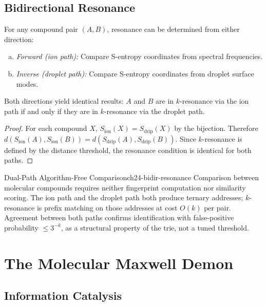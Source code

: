 \subsection{Bidirectional Resonance}
\label{sec:ch24-bidirectional}

\begin{theorem}
\label{thm:ch24-bidir}
For any compound pair $(A, B)$, resonance can be determined from either
direction:
\begin{enumerate}[(a)]
  \item \emph{Forward (ion path):} Compare S-entropy coordinates from
    spectral frequencies.
  \item \emph{Inverse (droplet path):} Compare S-entropy coordinates from
    droplet surface modes.
\end{enumerate}
Both directions yield identical results: $A$ and $B$ are in $k$-resonance via
the ion path if and only if they are in $k$-resonance via the droplet path.
\end{theorem}

\begin{proof}
For each compound $X$, $S_{\mathrm{ion}}(X) = S_{\mathrm{drip}}(X)$ by the
bijection.  Therefore $d(S_{\mathrm{ion}}(A), S_{\mathrm{ion}}(B)) =
d(S_{\mathrm{drip}}(A), S_{\mathrm{drip}}(B))$.  Since $k$-resonance is
defined by the distance threshold, the resonance condition is identical for
both paths.
\end{proof}

\begin{consequence}{Dual-Path Algorithm-Free Comparison}{ch24-bidir-resonance}
Comparison between molecular compounds requires neither fingerprint computation
nor similarity scoring.  The ion path and the droplet path both produce
ternary addresses; $k$-resonance is prefix matching on those addresses at
cost $O(k)$ per pair.  Agreement between both paths confirms identification
with false-positive probability $\leq 3^{-k}$, as a structural property of
the trie, not a tuned threshold.
\end{consequence}

\section{The Molecular Maxwell Demon}
\label{sec:ch24-mmd}

\subsection{Information Catalysis}
\label{sec:ch24-catalysis}

